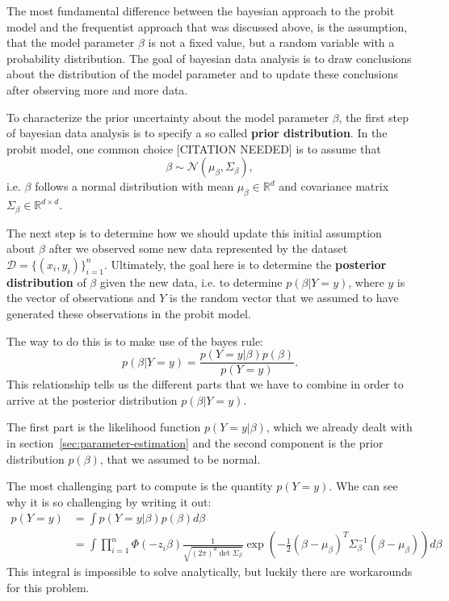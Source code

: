 The most fundamental difference between the bayesian approach to
the probit model and the frequentist approach that was discussed above,
is the assumption, that the model parameter $\beta$ is not a fixed
value, but a random variable with a probability distribution.
The goal of bayesian data analysis is to draw conclusions about
the distribution of the model parameter and to update these
conclusions after observing more and more data.

To characterize the prior uncertainty about the model parameter $\beta$,
the first step of bayesian data analysis is to specify a so called
\textbf{prior distribution}.
In the probit model, one common choice [CITATION NEEDED] is to assume that
\begin{equation}
    \beta \sim \mathcal{N}(\mu_\beta, \Sigma_\beta),
\end{equation}
i.e. $\beta$ follows a normal distribution with mean
$\mu_\beta \in \mathbb{R}^d$ and
covariance matrix $\Sigma_\beta \in \mathbb{R}^{d \times d}$.

The next step is to determine how we should update this initial
assumption about $\beta$ after we observed some new data
represented by the dataset $\mathcal{D} = \{(x_i, y_i)\}_{i=1}^n$.
Ultimately, the goal here is to determine the
\textbf{posterior distribution} of $\beta$ given the new data,
i.e. to determine $p(\beta | Y=y)$, where $y$ is the
vector of observations and $Y$ is the random vector that we
assumed to have generated these observations in the probit model.

The way to do this is to make use of the bayes rule:
\begin{equation}
    p(\beta | Y=y) = \frac{p(Y=y | \beta) p(\beta)}{p(Y=y)}.
\end{equation}
This relationship tells us the different parts that we have to combine
in order to arrive at the posterior distribution $p(\beta | Y=y)$.

The first part is the likelihood function $p(Y=y|\beta)$,
which we already dealt with in section~\ref{sec:parameter-estimation} and
the second component is the prior distribution $p(\beta)$,
that we assumed to be normal.

The most challenging part to compute is the quantity $p(Y=y)$.
Whe can see why it is so challenging by writing it out:
\begin{equation}
    \begin{split}
        p(Y=y) &= \int p(Y=y|\beta)p(\beta) d\beta \\
        &= \int \prod_{i=1}^n \Phi(- z_i \beta)
        \frac{1}{\sqrt{(2\pi)^d \det{\Sigma_\beta}}}
        \exp{\left(-\frac{1}{2}(\beta - \mu_\beta)^T \Sigma_\beta^{-1}(\beta - \mu_\beta)\right)} d\beta
    \end{split}
\end{equation}
This integral is impossible to solve analytically, but luckily
there are workarounds for this problem.

